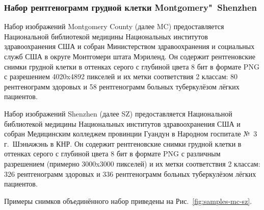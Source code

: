 
\subsubsection{Набор рентгенограмм грудной клетки Montgomery"~Shenzhen} \label{subsubsec:dataset-mc-sz}

Набор изображений Montgomery County (далее MC) предоставляется Национальной библиотекой медицины Национальных институтов здравоохранения США и собран Министерством здравоохранения и социальных служб США в округе Монтгомери штата Мэриленд. Он содержит рентгеновские снимки грудной клетки в оттенках серого с глубиной цвета 8 бит в формате PNG с разрешением 4020x4892 пикселей и их метки соответствия 2 классам: 80 рентгенограмм здоровых и 58 рентгенограмм больных туберкулёзом лёгких пациентов. %


Набор изображений Shenzhen (далее SZ) предоставляется Национальной библиотекой медицины Национальных институтов здравоохранения США и собран Медицинским колледжем провинции Гуандун в Народном госпитале №~3 г.~Шэньчжэнь в КНР. Он содержит рентгеновские снимки грудной клетки в оттенках серого с глубиной цвета 8 бит в формате PNG с различным разрешением (примерно 3000x3000 пикселей) и их метки соответствия 2 классам: 326 рентгенограмм здоровых и 336 рентгенограмм больных туберкулёзом лёгких пациентов.

Примеры снимков объединённого набор приведены на Рис.~\ref{fig:samples-mc-sz}.


